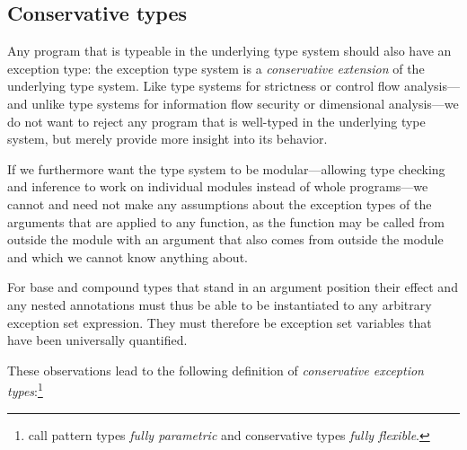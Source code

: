 \documentclass{llncs}
\begin{document}
\subsection{Conservative types}

Any program that is typeable in the underlying type system should also have an exception type: the exception type system is a \emph{conservative extension} of the underlying type system. Like type systems for strictness or control flow analysis---and unlike type systems for information flow security or dimensional analysis---we do not want to reject any program that is well-typed in the underlying type system, but merely provide more insight into its behavior.

If we furthermore want the type system to be modular---allowing type checking and inference to work on individual modules instead of whole programs---we cannot and need not make any assumptions about the exception types of the arguments that are applied to any function, as the function may be called from outside the module with an argument that also comes from outside the module and which we cannot know anything about.

For base and compound types that stand in an argument position their effect and any nested annotations must thus be able to be instantiated to any arbitrary exception set expression. They must therefore be exception set variables that have been universally quantified.

These observations lead to the following definition of \emph{conservative exception types}:\footnote{\cite{HoldermansHage} call pattern types \emph{fully parametric} and conservative types \emph{fully flexible}.}
\end{document}
